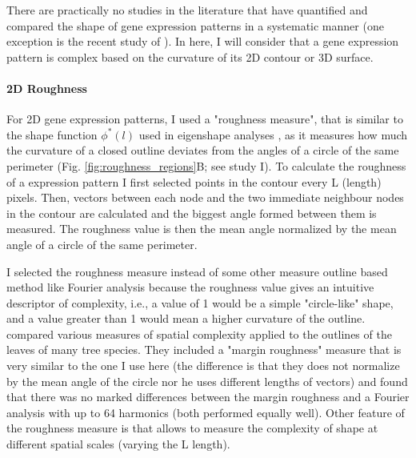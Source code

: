 There are practically no studies in the literature that have quantified and compared the shape of gene expression patterns in a systematic manner (one exception is the recent study of \citealp{Martinez-Abadias2016}). In here, I will consider that a gene expression pattern is complex based on the curvature of its 2D contour or 3D surface.

\paragraph{2D Roughness}
For 2D gene expression patterns, I used a "roughness measure", that is similar to the shape function $\phi^{*}(l)$ used in eigenshape analyses \citep{Lohmann1983}, as it measures how much the curvature of a closed outline deviates from the angles of a circle of the same perimeter (Fig. \ref{fig:roughness_regions}B; see study I). 
To calculate the roughness of a expression pattern I first selected points in the contour every L (length) pixels. Then, vectors between each node and the two immediate neighbour nodes in the contour are calculated and the biggest angle formed between them is measured. The roughness value is then the mean angle normalized by the mean angle of a circle of the same perimeter.

I selected the roughness measure instead of some other measure outline based method like Fourier analysis because the roughness value gives an intuitive descriptor of complexity, i.e., a value of 1 would be a simple "circle-like" shape, and a value greater than 1 would mean a higher curvature of the outline. \citet{McLellan1998} compared various measures of spatial complexity applied to the outlines of the leaves of many tree species. They included a "margin roughness" measure that is very similar to the one I use here (the difference is that they does not normalize by the mean angle of the circle nor he uses different lengths of vectors) and found that there was no marked differences between the margin roughness and a Fourier analysis with up to 64 harmonics (both performed equally well).
Other feature of the roughness measure is that allows to measure the complexity of shape at different spatial scales (varying the L length). 

